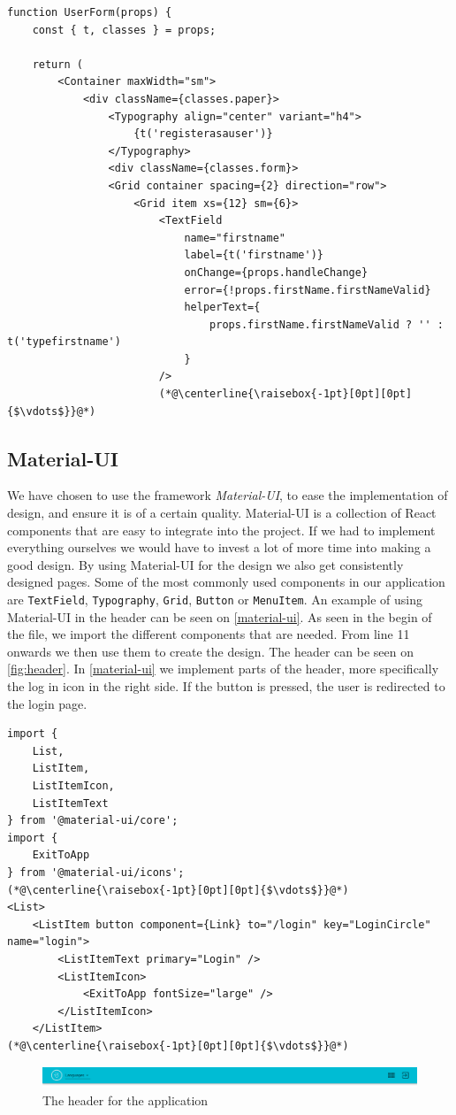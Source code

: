 \begin{lstlisting}[caption={Presentational component for userform}, captionpos=b, label={user-form}]
function UserForm(props) {
    const { t, classes } = props;
    
    return (
        <Container maxWidth="sm">
            <div className={classes.paper}>
                <Typography align="center" variant="h4">
                    {t('registerasauser')}
                </Typography>
                <div className={classes.form}>
                <Grid container spacing={2} direction="row">
                    <Grid item xs={12} sm={6}>
                        <TextField
                            name="firstname"
                            label={t('firstname')}
                            onChange={props.handleChange}
                            error={!props.firstName.firstNameValid}
                            helperText={
                                props.firstName.firstNameValid ? '' : t('typefirstname')
                            }
                        />
                        (*@\centerline{\raisebox{-1pt}[0pt][0pt]{$\vdots$}}@*)
\end{lstlisting}

\subsection{Material-UI}
We have chosen to use the framework \textit{Material-UI}, to ease the implementation of design, and ensure it is of a certain quality.
Material-UI is a collection of React components that are easy to integrate into the project.
If we had to implement everything ourselves we would have to invest a lot of more time into making a good design.
By using Material-UI for the design we also get consistently designed pages.
Some of the most commonly used components in our application are \texttt{TextField}, \texttt{Typography}, \texttt{Grid}, \texttt{Button} or \texttt{MenuItem}.
An example of using Material-UI in the header can be seen on \autoref{material-ui}.
As seen in the begin of the file, we import the different components that are needed.
From line 11 onwards we then use them to create the design.
The header can be seen on \autoref{fig:header}.
In \autoref{material-ui} we implement parts of the header, more specifically the log in icon in the right side.
If the button is pressed, the user is redirected to the login page.
\begin{lstlisting}[caption={Use of material-ui in the header}, captionpos=b, label={material-ui}]
import {
    List,
    ListItem,
    ListItemIcon,
    ListItemText
} from '@material-ui/core';
import {
	ExitToApp
} from '@material-ui/icons';
(*@\centerline{\raisebox{-1pt}[0pt][0pt]{$\vdots$}}@*)
<List>
    <ListItem button component={Link} to="/login" key="LoginCircle" name="login">
        <ListItemText primary="Login" />
        <ListItemIcon>
            <ExitToApp fontSize="large" />
        </ListItemIcon>
    </ListItem>
(*@\centerline{\raisebox{-1pt}[0pt][0pt]{$\vdots$}}@*)
\end{lstlisting}


\begin{figure}[H]
    \includegraphics[width=\linewidth]{figures/header.png}
    \caption{The header for the application}
    \label{fig:header}
\end{figure}
  
